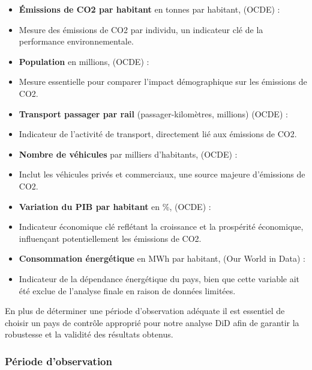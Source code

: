\begin{itemize}[itemsep=-0.5em]

    \item[] \textbf{Émissions de CO2 par habitant} en tonnes par habitant, (OCDE) \supercite{greenhouse} : 
    \item[] Mesure des émissions de CO2 par individu, un indicateur clé de la performance environnementale.

    \item[] \textbf{Population} en millions, (OCDE) \supercite{oecd_population} : 
    \item[] Mesure essentielle pour comparer l'impact démographique sur les émissions de CO2.
    \item[] \textbf{Transport passager par rail } (passager-kilomètres, millions) (OCDE)\supercite{oecd2023} : 
    \item[] Indicateur de l'activité de transport, directement lié aux émissions de CO2.
    
    \item[] \textbf{Nombre de véhicules } par milliers d'habitants, (OCDE) \supercite{oecd_transport} : 
    \item[] Inclut les véhicules privés et commerciaux, une source majeure d'émissions de CO2.
    
    \item[] \textbf{Variation du PIB par habitant} en \%, (OCDE) \supercite{gdp} : 
    \item[] Indicateur économique clé reflétant la croissance et la prospérité économique, influençant potentiellement les émissions de CO2.
    
    
    \item[] \textbf{Consommation énergétique} en MWh par habitant, (Our World in Data) \supercite{energy} : 
    \item[] Indicateur de la dépendance énergétique du pays, bien que cette variable ait été exclue de l'analyse finale en raison de données limitées.
\end{itemize}



En plus de déterminer une période d'observation adéquate il est essentiel de choisir un pays de contrôle approprié pour notre analyse DiD afin de garantir la robustesse et la validité des résultats obtenus.

\subsubsection{Période d'observation}
\label{subsec:observation_period}


